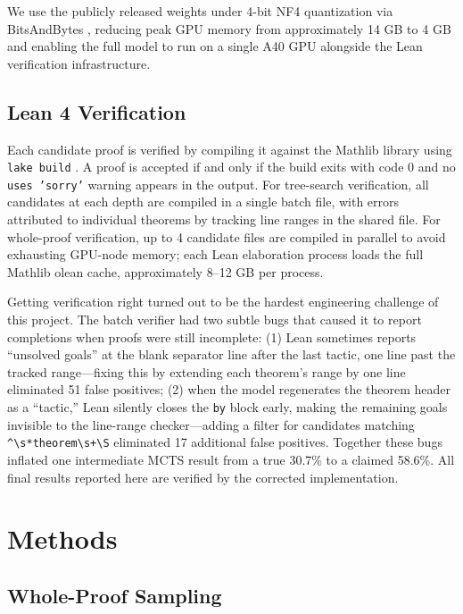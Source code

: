 \documentclass[openany, amssymb, psamsfonts]{amsart}
\theoremstyle{definition}
\numberwithin{equation}{section}
\begin{document}
We use the publicly released weights under 4-bit NF4 quantization via
BitsAndBytes \cite{bitsandbytes}, reducing peak GPU memory from approximately
14 GB to 4 GB and enabling the full model to run on a single A40 GPU alongside
the Lean verification infrastructure.

\subsection{Lean 4 Verification}

Each candidate proof is verified by compiling it against the Mathlib library
using \texttt{lake build} \cite{mathlib}.
A proof is accepted if and only if the build exits with code 0 and no
\texttt{uses 'sorry'} warning appears in the output.
For tree-search verification, all candidates at each depth are compiled in a
single batch file, with errors attributed to individual theorems by tracking
line ranges in the shared file.
For whole-proof verification, up to 4 candidate files are compiled in parallel
to avoid exhausting GPU-node memory; each Lean elaboration process loads the
full Mathlib olean cache, approximately 8--12 GB per process.

Getting verification right turned out to be the hardest engineering challenge
of this project.
The batch verifier had two subtle bugs that caused it to report completions
when proofs were still incomplete:
(1) Lean sometimes reports ``unsolved goals'' at the blank separator line
after the last tactic, one line past the tracked range---fixing this
by extending each theorem's range by one line eliminated 51 false positives;
(2) when the model regenerates the theorem header as a ``tactic,'' Lean
silently closes the \texttt{by} block early, making the remaining goals
invisible to the line-range checker---adding a filter for candidates
matching \verb|^\s*theorem\s+\S| eliminated 17 additional false positives.
Together these bugs inflated one intermediate MCTS result from a true 30.7\%
to a claimed 58.6\%.
All final results reported here are verified by the corrected implementation.

\section{Methods}

\subsection{Whole-Proof Sampling}
\end{document}
